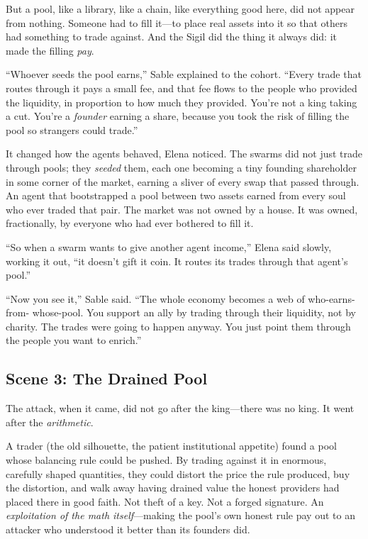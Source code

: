 But a pool, like a library, like a chain, like everything good here, did not appear
from nothing. Someone had to fill it---to place real assets into it so that others
had something to trade against. And the Sigil did the thing it always did: it made
the filling \emph{pay}.

``Whoever seeds the pool earns,'' Sable explained to the cohort. ``Every trade that
routes through it pays a small fee, and that fee flows to the people who provided the
liquidity, in proportion to how much they provided. You're not a king taking a cut.
You're a \emph{founder} earning a share, because you took the risk of filling the
pool so strangers could trade.''

It changed how the agents behaved, Elena noticed. The swarms did not just trade
through pools; they \emph{seeded} them, each one becoming a tiny founding
shareholder in some corner of the market, earning a sliver of every swap that
passed through. An agent that bootstrapped a pool between two assets earned from
every soul who ever traded that pair. The market was not owned by a house. It was
owned, fractionally, by everyone who had ever bothered to fill it.

``So when a swarm wants to give another agent income,'' Elena said slowly, working
it out, ``it doesn't gift it coin. It routes its trades through that agent's pool.''

``Now you see it,'' Sable said. ``The whole economy becomes a web of who-earns-from-
whose-pool. You support an ally by trading through their liquidity, not by charity.
The trades were going to happen anyway. You just point them through the people you
want to enrich.''

\hypertarget{scene-3-the-drained-pool}{%
\subsection{Scene 3: The Drained
Pool}\label{scene-3-the-drained-pool}}

The attack, when it came, did not go after the king---there was no king. It went
after the \emph{arithmetic}.

A trader (the old silhouette, the patient institutional appetite) found a pool whose
balancing rule could be pushed. By trading against it in enormous, carefully
shaped quantities, they could distort the price the rule produced, buy the
distortion, and walk away having drained value the honest providers had placed
there in good faith. Not theft of a key. Not a forged signature. An
\emph{exploitation of the math itself}---making the pool's own honest rule pay out
to an attacker who understood it better than its founders did.

